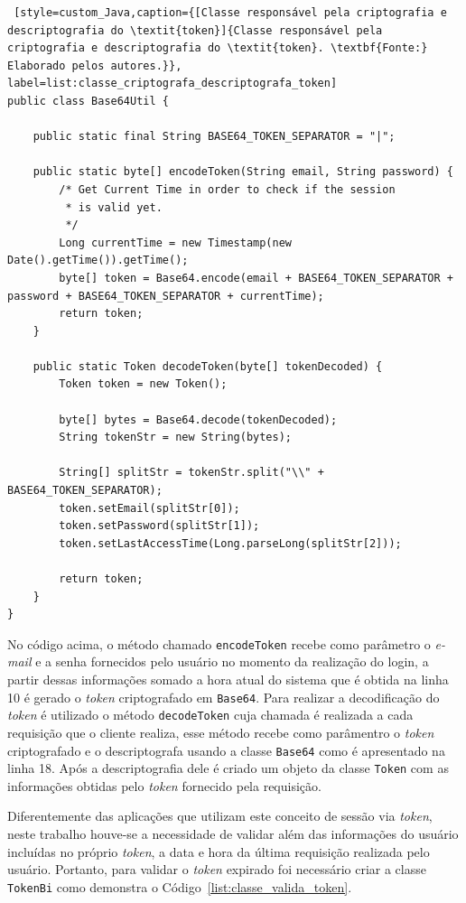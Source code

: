 \begin{lstlisting} [style=custom_Java,caption={[Classe responsável pela criptografia e descriptografia do \textit{token}]{Classe responsável pela criptografia e descriptografia do \textit{token}. \textbf{Fonte:} Elaborado pelos autores.}}, label=list:classe_criptografa_descriptografa_token]
public class Base64Util {
	
	public static final String BASE64_TOKEN_SEPARATOR = "|";
	
	public static byte[] encodeToken(String email, String password) {
		/* Get Current Time in order to check if the session
		 * is valid yet.
		 */
		Long currentTime = new Timestamp(new Date().getTime()).getTime();
		byte[] token = Base64.encode(email + BASE64_TOKEN_SEPARATOR + password + BASE64_TOKEN_SEPARATOR + currentTime);
		return token;
	}
	
	public static Token decodeToken(byte[] tokenDecoded) {
		Token token = new Token();
		
		byte[] bytes = Base64.decode(tokenDecoded);
		String tokenStr = new String(bytes);
		
		String[] splitStr = tokenStr.split("\\" + BASE64_TOKEN_SEPARATOR);
		token.setEmail(splitStr[0]);
		token.setPassword(splitStr[1]);
		token.setLastAccessTime(Long.parseLong(splitStr[2]));
		
		return token;
	}
}
\end{lstlisting}

No código acima, o método chamado \texttt{encodeToken} recebe como parâmetro o \textit{e-mail} e a senha fornecidos pelo usuário no momento da realização do login, a partir dessas informações somado a hora atual do sistema que é obtida na linha 10 é gerado o \textit{token} criptografado em \texttt{Base64}. Para realizar a decodificação do \textit{token} é utilizado o método \texttt{decodeToken} cuja chamada é realizada a cada requisição que o cliente realiza, esse método recebe como parâmentro o \textit{token} criptografado e o descriptografa usando a classe \texttt{Base64} como é apresentado na linha 18. Após a descriptografia dele é criado um objeto da classe \texttt{Token} com as informações obtidas pelo \textit{token} fornecido pela requisição.

Diferentemente das aplicações que utilizam este conceito de sessão via \textit{token}, neste trabalho houve-se a necessidade de validar além das informações do usuário incluídas no próprio \textit{token}, a data e hora da última requisição realizada pelo usuário. Portanto, para validar o \textit{token} expirado foi necessário criar a classe \texttt{TokenBi} como demonstra o Código~\ref{list:classe_valida_token}.

